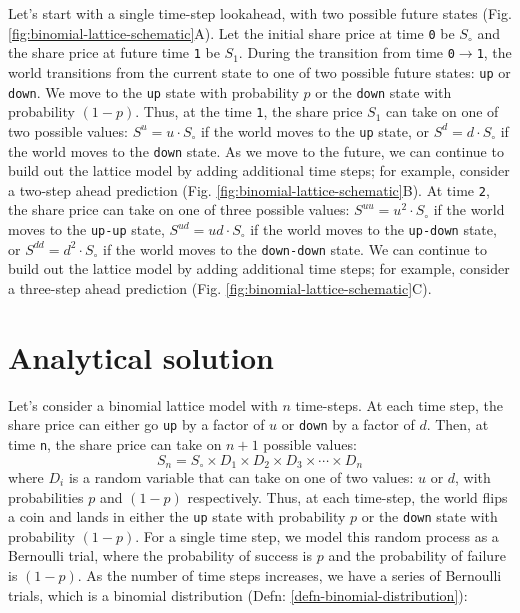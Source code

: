 \documentclass[11pt]{article}
\theoremstyle{definition}
\begin{document}
Let's start with a single time-step lookahead, with two possible future states (Fig. \ref{fig:binomial-lattice-schematic}A).
Let the initial share price at time \texttt{0} be $S_{\circ}$ and the share price at future time \texttt{1} be $S_{1}$.
During the transition from time \texttt{0}$\rightarrow$\texttt{1}, the world transitions from the current state to one of two possible future states: \texttt{up} or \texttt{down}.
We move to the \texttt{up} state with probability $p$ or the \texttt{down} state with probability $(1-p)$.
Thus, at the time \texttt{1}, the share price $S_{1}$ can take on one of two possible values: $S^{u} = u\cdot{S_{\circ}}$ if the world moves 
to the \texttt{up} state, or $S^{d} = d\cdot{S_{\circ}}$ if the world moves to the \texttt{down} state. 
As we move to the future, we can continue to build out the lattice model by adding additional time steps; for example, consider a two-step ahead prediction (Fig. \ref{fig:binomial-lattice-schematic}B). 
At time \texttt{2}, the share price can take on one of three possible values: $S^{uu} = u^{2}\cdot{S_{\circ}}$ if the world moves
to the \texttt{up-up} state, $S^{ud} = ud\cdot{S_{\circ}}$ if the world moves to the \texttt{up-down} state, or $S^{dd} = d^{2}\cdot{S_{\circ}}$ if the world moves to the \texttt{down-down} state.
We can continue to build out the lattice model by adding additional time steps; for example, consider a three-step ahead prediction (Fig. \ref{fig:binomial-lattice-schematic}C).

\section*{Analytical solution}
Let's consider a binomial lattice model with $n$ time-steps. At each time step, the share price can either go \texttt{up} by a factor of $u$ or \texttt{down} by a factor of $d$.
Then, at time \texttt{n}, the share price can take on $n+1$ possible values: 
\begin{equation}
	S_{n} = S_{\circ}\times{D_{1}}\times{D_{2}}\times{D_{3}}\times\cdots\times{D_{n}}
\end{equation}
where $D_{i}$ is a random variable that can take on one of two values: $u$ or $d$, 
with probabilities $p$ and $(1-p)$ respectively. 
Thus, at each time-step, the world flips a coin and lands in either the \texttt{up} state with probability $p$ or the \texttt{down} state with probability $(1-p)$.
For a single time step, we model this random process as a Bernoulli trial, where the probability of success is $p$ and the probability of failure is $(1-p)$.
As the number of time steps increases, we have a series of Bernoulli trials, which is a binomial distribution (Defn: \ref{defn-binomial-distribution}):
\end{document}
